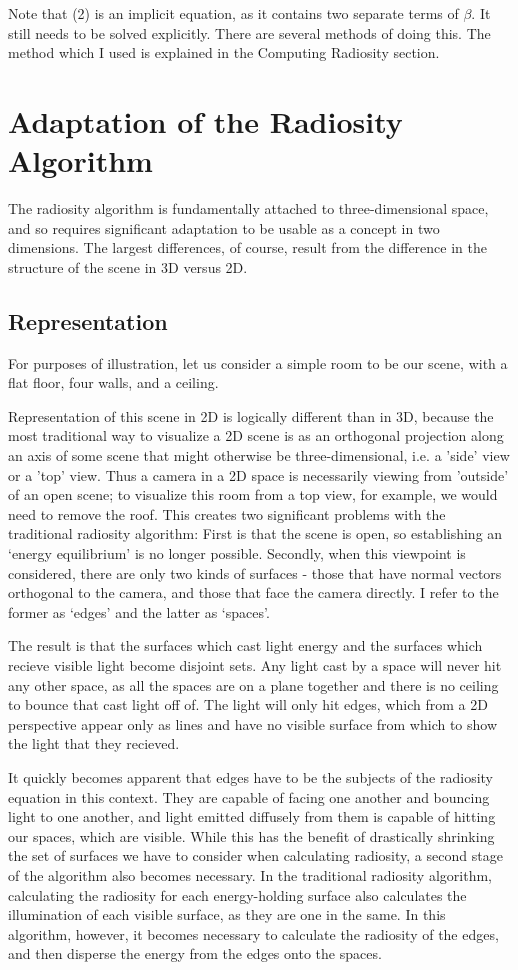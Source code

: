 \documentclass[letter]{article}
\begin{document}
Note that (2) is an implicit equation, as it contains two separate terms of $\beta$. It still needs to be solved explicitly. There are several methods of doing this. The method which I used is explained in the Computing Radiosity section.
\section{Adaptation of the Radiosity Algorithm}
The radiosity algorithm is fundamentally attached to three-dimensional space, and so requires significant adaptation to be usable as a concept in two dimensions. The largest differences, of course, result from the difference in the structure of the scene in 3D versus 2D.

\subsection{Representation}
For purposes of illustration, let us consider a simple room to be our scene, with a flat floor, four walls, and a ceiling.

Representation of this scene in 2D is logically different than in 3D, because the most traditional way to visualize a 2D scene is as an orthogonal projection along an axis of some scene that might otherwise be three-dimensional, i.e. a 'side' view or a 'top' view. Thus a camera in a 2D space is necessarily viewing from 'outside' of an open scene; to visualize this room from a top view, for example, we would need to remove the roof. This creates two significant problems with the traditional radiosity algorithm: First is that the scene is open, so establishing an `energy equilibrium' is no longer possible. Secondly, when this viewpoint is considered, there are only two kinds of surfaces - those that have normal vectors orthogonal to the camera, and those that face the camera directly.  I refer to the former as `edges' and the latter as `spaces'. 

The result is that the surfaces which cast light energy and the surfaces which recieve visible light become disjoint sets. Any light cast by a space will never hit any other space, as all the spaces are on a plane together and there is no ceiling to bounce that cast light off of. The light will only hit edges, which from a 2D perspective appear only as lines and have no visible surface from which to show the light that they recieved.

It quickly becomes apparent that edges have to be the subjects of the radiosity equation in this context. They are capable of facing one another and bouncing light to one another, and light emitted diffusely from them is capable of hitting our spaces, which are visible. While this has the benefit of drastically shrinking the set of surfaces we have to consider when calculating radiosity, a second stage of the algorithm also becomes necessary. In the traditional radiosity algorithm, calculating the radiosity for each energy-holding surface also calculates the illumination of each visible surface, as they are one in the same. In this algorithm, however, it becomes necessary to calculate the radiosity of the edges, and then disperse the energy from the edges onto the spaces.
\end{document}
